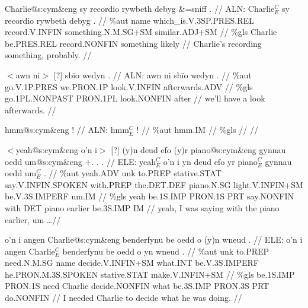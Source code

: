 \documentclass[a4paper,10pt]{article}
\begin{document}
\ex
\begingl[lingstyle=gergl]
\glchat Charlie@s:cym\&eng sy recordio rywbeth debyg \&=sniff . //
\glsurface ALN:  Charlie$^{C}_{E}$ sy recordio rywbeth debyg .  //
\glauto \%aut  name which\_is{\scriptsize .V.3SP.PRES.REL} record{\scriptsize .V.INFIN} something{\scriptsize .N.M.SG+SM} similar{\scriptsize .ADJ+SM}   //
\glmanual \%gls  Charlie be{\scriptsize .PRES.REL} record{\scriptsize .NONFIN} something likely   //
\gleng Charlie's recording something, probably. //
\endgl
\xe

\ex
\begingl[lingstyle=gergl]
\glchat $<$awn ni$>$ [?] sbïo wedyn . //
\glsurface ALN:  awn ni sbïo wedyn .  //
\glauto \%aut  go{\scriptsize .V.1P.PRES} we{\scriptsize .PRON.1P} look{\scriptsize .V.INFIN} afterwards{\scriptsize .ADV}   //
\glmanual \%gls  go{\scriptsize .1PL.NONPAST} PRON{\scriptsize .1PL} look{\scriptsize .NONFIN} after   //
\gleng we'll have a look afterwards. //
\endgl
\xe

\ex
\begingl[lingstyle=gergl]
\glchat hmm@s:cym\&eng ! //
\glsurface ALN:  hmm$^{C}_{E}$ !  //
\glauto \%aut  hmm{\scriptsize .IM}   //
\glmanual \%gls     //
\gleng  //
\endgl
\xe

\ex
\begingl[lingstyle=gergl]
\glchat $<$yeah@s:cym\&eng o'n i$>$ [?] (y)n deud efo (y)r piano@s:cym\&eng gynnau oedd um@s:cym\&eng +. . . //
\glsurface ELE:  yeah$^{C}_{E}$ o'n i yn deud efo yr piano$^{C}_{E}$ gynnau oedd um$^{C}_{E}$ .  //
\glauto \%aut  yeah{\scriptsize .ADV} unk to{\scriptsize .PREP} stative{\scriptsize .STAT} say{\scriptsize .V.INFIN.SPOKEN} with{\scriptsize .PREP} the{\scriptsize .DET.DEF} piano{\scriptsize .N.SG} light{\scriptsize .V.INFIN+SM} be{\scriptsize .V.3S.IMPERF} um{\scriptsize .IM}   //
\glmanual \%gls  yeah be{\scriptsize .1S.IMP} PRON{\scriptsize .1S} PRT say{\scriptsize .NONFIN} with DET piano earlier be{\scriptsize .3S.IMP} IM   //
\gleng yeah, I was saying with the piano earlier, um \dots  //
\endgl
\xe

\ex
\begingl[lingstyle=gergl]
\glchat o'n i angen Charlie@s:cym\&eng benderfynu be oedd o (y)n wneud . //
\glsurface ELE:  o'n i angen Charlie$^{C}_{E}$ benderfynu be oedd o yn wneud .  //
\glauto \%aut  unk to{\scriptsize .PREP} need{\scriptsize .N.M.SG} name decide{\scriptsize .V.INFIN+SM} what{\scriptsize .INT} be{\scriptsize .V.3S.IMPERF} he{\scriptsize .PRON.M.3S.SPOKEN} stative{\scriptsize .STAT} make{\scriptsize .V.INFIN+SM}   //
\glmanual \%gls  be{\scriptsize .1S.IMP} PRON{\scriptsize .1S} need Charlie decide{\scriptsize .NONFIN} what be{\scriptsize .3S.IMP} PRON{\scriptsize .3S} PRT do{\scriptsize .NONFIN}   //
\gleng I needed Charlie to decide what he was doing. //
\endgl
\xe
\end{document}
